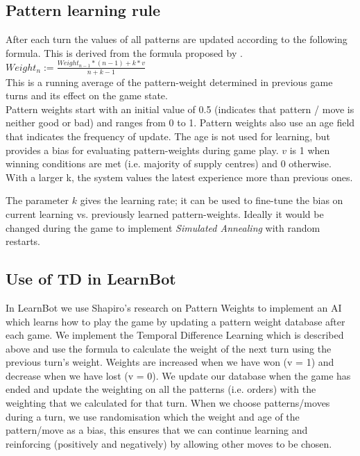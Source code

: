 \documentclass[pdftex,11pt,a4paper]{report}
\begin{document}
\subsection{Pattern learning rule}

After each turn the values of all patterns are updated
according to the following formula. This is derived from
the formula proposed by \cite{Shapiro02}. \\

$Weight_{n} := \frac{Weight_{n-1}*(n-1)+k*v}{n+k-1}$ \\

This is a running average of the pattern-weight determined
in previous game turns and its effect on the game state. \\

Pattern weights start with an initial value of 0.5 (indicates
that pattern / move is neither good or bad) and ranges from 0 to 1. 
Pattern weights also use an age field that indicates the frequency
of update. The age is not used for learning, but provides a bias
for evaluating pattern-weights during game play. $v$ is 1 when
winning conditions are met (i.e. majority of supply centres)
and 0 otherwise. With a larger k, the system values the latest
experience more than previous ones.

The parameter $k$ gives the learning rate; it can be used
to fine-tune the bias on current learning vs. previously
learned pattern-weights. Ideally it would be changed during
the game to implement \textit{Simulated Annealing} with
random restarts. \\

\subsection{Use of TD in LearnBot}
In LearnBot we use Shapiro's research on Pattern Weights
\cite{Shapiro02} to implement an AI which learns how to play the game
by updating a pattern weight database after each game.  We implement
the Temporal Difference Learning which is described above and use the
formula to calculate the weight of the next turn using the previous
turn's weight.  Weights are increased when we have won (v = 1) and
decrease when we have lost (v = 0). We update our database when the
game has ended and update the weighting on all the patterns
(i.e. orders) with the weighting that we calculated for that turn.
When we choose patterns/moves during a turn, we use randomisation
which the weight and age of the pattern/move as a bias, this ensures
that we can continue learning and reinforcing (positively and
negatively) by allowing other moves to be chosen.
\end{document}
